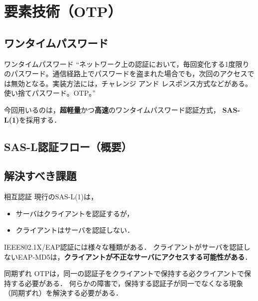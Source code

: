 \section{要素技術（OTP）}
\toc
\subsection{ワンタイムパスワード}
\begin{frame}[c]{\ft}
    \begin{block}{ワンタイムパスワード}
        ``ネットワーク上の認証において，毎回変化する1度限りのパスワード。通信経路上でパスワードを盗まれた場合でも，次回のアクセスでは無効となる。実装方法には，チャレンジ アンド レスポンス方式などがある。使い捨てパスワード。OTP。''
    \end{block}
    \vfill
    今回用いるのは，\textbf{超軽量}かつ\textbf{高速}のワンタイムパスワード認証方式，\textbf{\color{red} SAS-L(1)}を採用する．
\end{frame}
\subsection{SAS-L認証フロー（概要）}
\begin{frame}{\ft}
    
\end{frame}
\subsection{解決すべき課題}
\begin{frame}[t]{\ft}
    \begin{alertblock}{相互認証\hfill\textbf{}}
        現行のSAS-L(1)は，
        \begin{itemize}
            \item サーバはクライアントを認証するが，
            \item クライアントはサーバを認証しない．
        \end{itemize}
        IEEE802.1X/EAP認証には様々な種類がある．
        クライアントがサーバを認証しないEAP-MD5は，\textbf{クライアントが不正なサーバにアクセスする可能性がある}．
    \end{alertblock}
    \begin{alertblock}{同期ずれ\hfill\textbf{}}
        OTPは，同一の認証子をクライアントで保持する必クライアントで保持する必要がある．
        何らかの障害で，保持する認証子が同一でなくなる現象（同期ずれ）を解決する必要がある．
    \end{alertblock}
\end{frame}